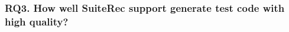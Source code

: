 \documentclass[conference]{IEEEtran}
\begin{document}
\subsubsection{RQ3. How well \textsf{SuiteRec} support generate test code with high quality?}
\end{document}
